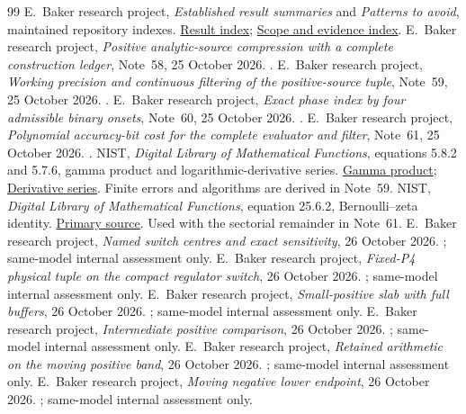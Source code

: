 \begin{thebibliography}{99}
E.~Baker research project, \emph{Established result summaries} and
\emph{Patterns to avoid}, maintained repository indexes.
\href{run:\researchroot/result-summaries/README.md}{Result index};
\href{run:\researchroot/avoid/README.md}{Scope and evidence index}.
E.~Baker research project, \emph{Positive analytic-source compression
with a complete construction ledger}, Note~58, 25 October 2026.
.
E.~Baker research project, \emph{Working precision and continuous
filtering of the positive-source tuple}, Note~59, 25 October 2026.
.
E.~Baker research project, \emph{Exact phase index by four admissible
binary onsets}, Note~60, 25 October 2026.
.
E.~Baker research project, \emph{Polynomial accuracy-bit cost for the
complete evaluator and filter}, Note~61, 25 October 2026.
.
NIST, \emph{Digital Library of Mathematical Functions}, equations
5.8.2 and 5.7.6, gamma product and logarithmic-derivative series.
\href{https://dlmf.nist.gov/5.8.E2}{Gamma product};
\href{https://dlmf.nist.gov/5.7.E6}{Derivative series}.
Finite errors and algorithms are derived in Note~59.
NIST, \emph{Digital Library of Mathematical Functions}, equation 25.6.2,
Bernoulli--zeta identity.
\href{https://dlmf.nist.gov/25.6.E2}{Primary source}.
Used with the sectorial remainder in Note~61.
E.~Baker research project, \emph{Named switch centres and exact sensitivity}, 26 October 2026.
; same-model internal assessment only.
E.~Baker research project, \emph{Fixed-P4 physical tuple on the compact regulator switch}, 26 October 2026.
; same-model internal assessment only.
E.~Baker research project, \emph{Small-positive slab with full buffers}, 26 October 2026.
; same-model internal assessment only.
E.~Baker research project, \emph{Intermediate positive comparison}, 26 October 2026.
; same-model internal assessment only.
E.~Baker research project, \emph{Retained arithmetic on the moving positive band}, 26 October 2026.
; same-model internal assessment only.
E.~Baker research project, \emph{Moving negative lower endpoint}, 26 October 2026.
; same-model internal assessment only.
\end{thebibliography}
